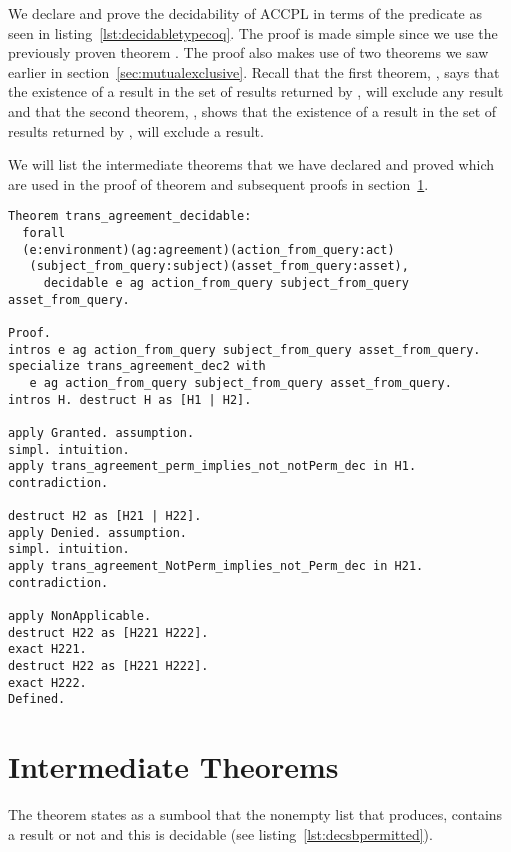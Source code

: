 We declare and prove the decidability of \ac{ACCPL} in terms of the  predicate as seen in listing~\ref{lst:decidabletypecoq}. The proof is made simple since we use the previously proven theorem . The proof also makes use of two theorems we saw earlier in section~\ref{sec:mutualexclusive}. Recall that the first theorem, , says that the existence of a  result in the set of results returned by , will exclude any  result and that the second theorem, , shows that the existence of a  result in the set of results returned by , will exclude a  result.

We will list the intermediate theorems that we have declared and proved which are used in the proof of theorem  and subsequent proofs in section~\ref{sec:intermediatetheorems}.

\begin{lstlisting}
Theorem trans_agreement_decidable:
  forall
  (e:environment)(ag:agreement)(action_from_query:act)
   (subject_from_query:subject)(asset_from_query:asset),
     decidable e ag action_from_query subject_from_query asset_from_query.

Proof.
intros e ag action_from_query subject_from_query asset_from_query.
specialize trans_agreement_dec2 with 
   e ag action_from_query subject_from_query asset_from_query.
intros H. destruct H as [H1 | H2].

apply Granted. assumption.
simpl. intuition.
apply trans_agreement_perm_implies_not_notPerm_dec in H1. contradiction. 

destruct H2 as [H21 | H22].
apply Denied. assumption.
simpl. intuition.
apply trans_agreement_NotPerm_implies_not_Perm_dec in H21. contradiction. 

apply NonApplicable. 
destruct H22 as [H221 H222].
exact H221.
destruct H22 as [H221 H222].
exact H222.
Defined.
\end{lstlisting}

 

\section{Intermediate Theorems}\label{sec:intermediatetheorems}
The theorem  states as a sumbool that the nonempty list that  produces, contains a  result or not and this is decidable (see listing~\ref{lst:decsbpermitted}).


